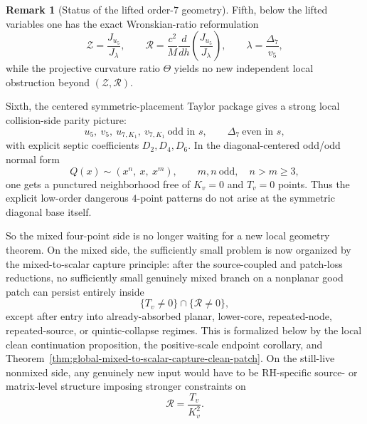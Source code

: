 \documentclass[11pt,a4paper]{amsart}
\theoremstyle{plain}
\theoremstyle{definition}
\newtheorem{remark}[theorem]{Remark}
\begin{document}
\begin{remark}[Status of the lifted order-$7$ geometry]
Fifth, below the lifted variables one has the exact Wronskian-ratio
reformulation
\[
\mathcal Z=\frac{J_{u_5}}{J_\lambda},
\qquad
\mathcal R=\frac{c^2}{M}\frac{d}{dh}\!\left(\frac{J_{u_5}}{J_\lambda}\right),
\qquad
\lambda=\frac{\Delta_7}{v_5},
\]
while the projective curvature ratio $\Theta$ yields no new independent local
obstruction beyond $(\mathcal Z,\mathcal R)$.

Sixth, the centered symmetric-placement Taylor package gives a strong local
collision-side parity picture:
\[
u_5,\ v_5,\ u_{7,K_1},\ v_{7,K_1}\ \text{odd in }s,
\qquad
\Delta_7\ \text{even in }s,
\]
with explicit septic coefficients $D_2,D_4,D_6$. In the diagonal-centered
odd/odd normal form
\[
Q(x)\sim (x^n,\ x,\ x^m),
\qquad
m,n\ \text{odd},\quad n>m\ge 3,
\]
one gets a punctured neighborhood free of $K_v=0$ and $T_v=0$ points.
Thus the explicit low-order dangerous $4$-point patterns do not arise at the
symmetric diagonal base itself.

So the mixed four-point side is no longer waiting for a new local geometry
theorem. On the mixed side, the sufficiently small problem is now organized by
the mixed-to-scalar capture principle: after the source-coupled and patch-loss
reductions, no sufficiently small genuinely mixed branch on a nonplanar good
patch can persist entirely inside
\[
\{T_v\neq 0\}\cap\{\mathcal R\neq 0\},
\]
except after entry into already-absorbed planar, lower-core, repeated-node,
repeated-source, or quintic-collapse regimes. This is formalized below by the
local clean continuation proposition, the positive-scale endpoint corollary, and
Theorem~\ref{thm:global-mixed-to-scalar-capture-clean-patch}. On the still-live
nonmixed side, any genuinely new input would have to be RH-specific source- or
matrix-level structure imposing stronger constraints on
\[
\mathcal R=\frac{T_v}{K_v^2}.
\]
\end{remark}
\end{document}
